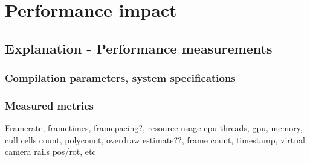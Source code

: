 
\chapter{Performance impact}
\section{Explanation - Performance measurements}
\subsection{Compilation parameters, system specifications}
\subsection{Measured metrics}
Framerate, frametimes, framepacing?, resource usage cpu threads, gpu, memory, cull cells count, polycount, overdraw estimate??, frame count, timestamp, virtual camera rails pos/rot, etc